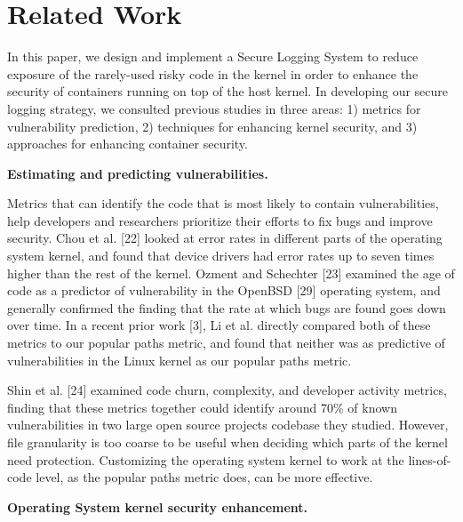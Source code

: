 \section{Related Work}
\label{sec.related_work}
In this paper, we design and implement a Secure Logging System to reduce exposure of the rarely-used risky code in the kernel in order to 
enhance the security of containers running on top of the host kernel. In developing our secure logging strategy, we consulted previous studies in three areas: 
1) metrics for vulnerability prediction, 2) techniques for enhancing kernel security, and 3) approaches for enhancing container security. 

\textbf{Estimating and predicting vulnerabilities.} 

Metrics that can identify the code that is most likely to contain vulnerabilities, 
help developers and researchers prioritize their efforts to fix bugs and improve security. 
Chou et al. [22] looked at error rates in different parts of the operating system kernel, and found that device drivers had error rates up to seven times higher than 
the rest of the kernel. Ozment and Schechter [23] examined the age of code as a predictor of vulnerability in the OpenBSD [29] operating system, 
and generally confirmed the finding that the rate at which bugs are found goes down over time. In a recent prior work [3], Li et al. directly compared both of these metrics to 
our popular paths metric, and found that neither was as predictive of vulnerabilities in the Linux kernel as our popular paths metric. 

Shin et al. [24] examined code churn, complexity, and developer activity metrics, finding that these metrics together could identify around 70\% of known vulnerabilities 
in two large open source projects codebase they studied. However, file granularity is too coarse to be useful when deciding which parts of the kernel need protection. 
Customizing the operating system kernel to work at the lines-of-code level, as the popular paths metric does, can be more effective. 

\textbf{Operating System kernel security enhancement.} 

